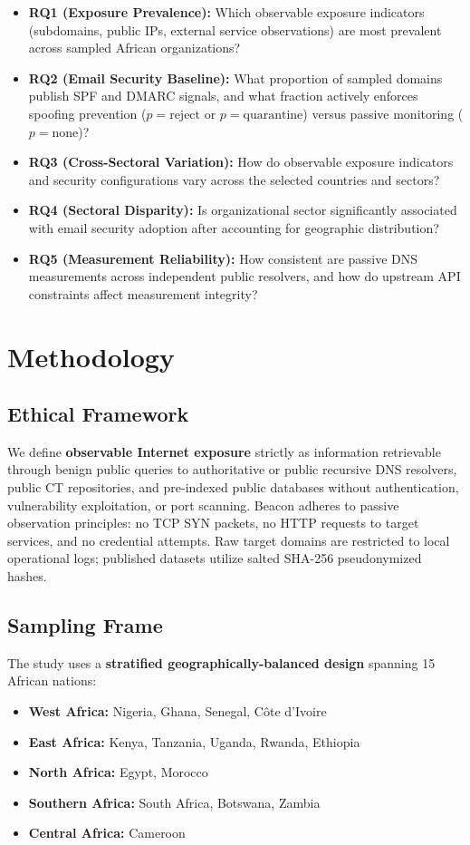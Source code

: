 \documentclass[conference]{IEEEtran}
\begin{document}
\begin{itemize}
    \item \textbf{RQ1 (Exposure Prevalence):} Which observable exposure indicators (subdomains, public IPs, external service observations) are most prevalent across sampled African organizations?
    \item \textbf{RQ2 (Email Security Baseline):} What proportion of sampled domains publish SPF and DMARC signals, and what fraction actively enforces spoofing prevention ($p=\text{reject}$ or $p=\text{quarantine}$) versus passive monitoring ($p=\text{none}$)?
    \item \textbf{RQ3 (Cross-Sectoral Variation):} How do observable exposure indicators and security configurations vary across the selected countries and sectors?
    \item \textbf{RQ4 (Sectoral Disparity):} Is organizational sector significantly associated with email security adoption after accounting for geographic distribution?
    \item \textbf{RQ5 (Measurement Reliability):} How consistent are passive DNS measurements across independent public resolvers, and how do upstream API constraints affect measurement integrity?
\end{itemize}

\section{Methodology}

\subsection{Ethical Framework}
We define \textbf{observable Internet exposure} strictly as information retrievable through benign public queries to authoritative or public recursive DNS resolvers, public CT repositories, and pre-indexed public databases without authentication, vulnerability exploitation, or port scanning. Beacon adheres to passive observation principles: no TCP SYN packets, no HTTP requests to target services, and no credential attempts. Raw target domains are restricted to local operational logs; published datasets utilize salted SHA-256 pseudonymized hashes.

\subsection{Sampling Frame}
The study uses a \textbf{stratified geographically-balanced design} spanning 15 African nations:
\begin{itemize}
    \item \textbf{West Africa:} Nigeria, Ghana, Senegal, Côte d'Ivoire
    \item \textbf{East Africa:} Kenya, Tanzania, Uganda, Rwanda, Ethiopia
    \item \textbf{North Africa:} Egypt, Morocco
    \item \textbf{Southern Africa:} South Africa, Botswana, Zambia
    \item \textbf{Central Africa:} Cameroon
\end{itemize}
\end{document}
